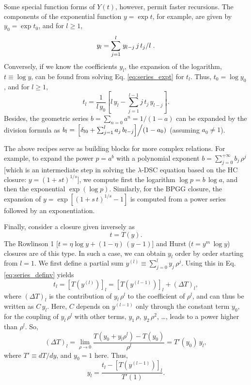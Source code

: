\documentclass[aip,jcp,preprint,superscriptaddress,showpacs,preprintnumbers,amsmath,amssymb]{revtex4-1}
\numberwithin{equation}{section}
\begin{document}
Some special function forms of $Y(t)$, however,
permit faster recursions.
%
The components of the exponential function $y = \exp t$,
for example, are given by
$y_0 = \exp t_0$,
and for $l \ge 1$,
%
\begin{equation}
y_l
=
\sum_{j = 1}^l
  \left.
    y_{l - j} \, j \, t_j
  \middle/
    l
  \right..
\label{eq:series_expt}
\end{equation}
%
Conversely,
if we know the coefficients $y_l$,
the expansion of the logarithm,
$t \equiv \log y$,
can be found from solving Eq. \eqref{eq:series_expt} for $t_l$.
%
Thus,
$t_0 = \log y_0$,
and for $l \ge 1$,
%
%
%
\begin{equation}
t_l
=
\frac{ 1 } { l \, y_0 }
\left[
  l \, y_l
  -
  \sum_{j = 1}^{l - 1}
    j \, t_j \, y_{l - j}
\right].
\label{eq:series_logy}
\end{equation}
%
%
%
Besides,
the geometric series $b = \sum_{n = 0} a^n = 1/(1-a)$
can be expanded by the division formula as
%
$b_l =
\left.
  \left[ \delta_{l0} + \sum_{j = 1}^l a_j \, b_{l-j}\right]
\middle/
  (1 - a_0)
\right.$
%
(assuming $a_0 \ne 1$).



The above recipes serve as building blocks
for more complex relations.
%
For example,
to expand the power $p = a^b$
with a polynomial exponent
$b = \sum_{j = 0}^{+\infty} b_j \, \rho^j$
[which is an intermediate step in
solving the $\lambda$-DSC equation
based on the HC closure\cite{
hutchinson1971, *hutchinson1972}:
$y = (1 + s t)^{1/s}$],
%
we compute first the logarithm
$\log p = b \, \log a$,
and then the exponential
$\exp(\log p)$.
%
Similarly,
for the BPGG closure\cite{ballone1986},
the expansion of
$y = \exp\left[ (1 + s \, t)^{1/s} - 1 \right]$
is computed from a power series
followed by an exponentiation.



Finally, consider a closure given inversely as
%
%
%
\begin{equation}
t = T(y).
\label{eq:series_definv}
\end{equation}
%
%
%
The Rowlinson 1\cite{rowlinson1965}
[$t = \eta \log y + (1 - \eta) \, (y-1)$]
and Hurst\cite{hurst1965}
($t = y^m \, \log y$)
closures are of this type.
%
In such a case,
we can obtain $y_l$
order by order starting from $l = 1$.
%
We first define a partial sum
$y^{(l)} \equiv \sum_{j=0}^l y_j \, \rho^j$.
%
Using this in Eq. \eqref{eq:series_definv} yields
%
%
%
\[
t_l
=
\left[ T( y^{(l)} ) \right]_l
=
\left[ T( y^{(l-1)} ) \right]_l
+
( \Delta T )_l,
\]
%
%
%
where
$( \Delta T )_l$
is the contribution of $y_l \, \rho^l$
to the coefficient of $\rho^l$,
and can thus be written as $C \, y_l$.
%
Here,
$C$ depends on $y^{(l - 1)}$ only through
the constant term $y_0$,
for the coupling of $y_l \, \rho^l$
with other terms,
$y_1 \, \rho$, $y_2 \, \rho^2$, \dots,
leads to a power higher than $\rho^l$.
%
So,
\[
(\Delta T)_l
=
\lim_{ \rho \rightarrow 0 }
  \frac{ T(y_0 + y_l \rho^l) - T(y_0) }
       { \rho^l }
=
T'(y_0) \, y_l,
\]
%
where $T' \equiv dT/dy$,
and
$y_0 = 1$ here.
%
Thus,
\[
y_l
=
\frac{ t_l - \left[ T(y^{(l - 1)}) \right]_l }
     { T'(1) }.
\]
\end{document}
